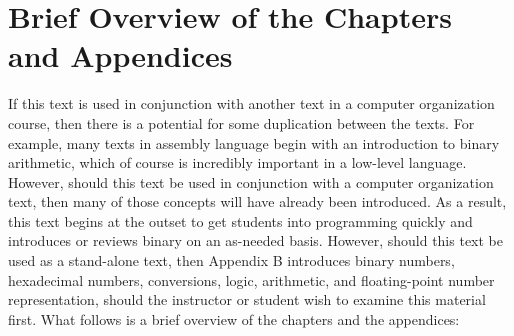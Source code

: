 \documentclass[10pt]{article}
\begin{document}
\section*{Brief Overview of the Chapters and Appendices}
If this text is used in conjunction with another text in a computer organization course, then there is a potential for some duplication between the texts. For example, many texts in assembly language begin with an introduction to binary arithmetic, which of course is incredibly important in a low-level language. However, should this text be used in conjunction with a computer organization text, then many of those concepts will have already been introduced. As a result, this text begins at the outset to get students into programming quickly and introduces or reviews binary on an as-needed basis. However, should this text be used as a stand-alone text, then Appendix B introduces binary numbers, hexadecimal numbers, conversions, logic, arithmetic, and floating-point number representation, should the instructor or student wish to examine this material first. What follows is a brief overview of the chapters and the appendices:
\end{document}
